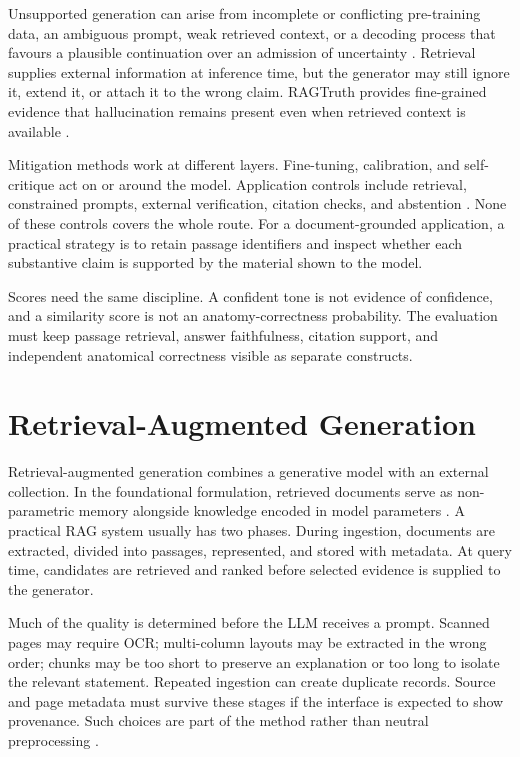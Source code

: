 Unsupported generation can arise from incomplete or conflicting pre-training data, an ambiguous prompt, weak retrieved context, or a decoding process that favours a plausible continuation over an admission of uncertainty \parencite{ji2023,wang2024factuality}. Retrieval supplies external information at inference time, but the generator may still ignore it, extend it, or attach it to the wrong claim. RAGTruth provides fine-grained evidence that hallucination remains present even when retrieved context is available \parencite{niu2024ragtruth}.

Mitigation methods work at different layers. Fine-tuning, calibration, and self-critique act on or around the model. Application controls include retrieval, constrained prompts, external verification, citation checks, and abstention \parencite{ji2023,wang2024factuality}. None of these controls covers the whole route. For a document-grounded application, a practical strategy is to retain passage identifiers and inspect whether each substantive claim is supported by the material shown to the model.

Scores need the same discipline. A confident tone is not evidence of confidence, and a similarity score is not an anatomy-correctness probability. The evaluation must keep passage retrieval, answer faithfulness, citation support, and independent anatomical correctness visible as separate constructs.

\section{Retrieval-Augmented Generation}
\label{sec:rag-background}

Retrieval-augmented generation combines a generative model with an external collection. In the foundational formulation, retrieved documents serve as non-parametric memory alongside knowledge encoded in model parameters \parencite{lewis2020}. A practical RAG system usually has two phases. During ingestion, documents are extracted, divided into passages, represented, and stored with metadata. At query time, candidates are retrieved and ranked before selected evidence is supplied to the generator.

Much of the quality is determined before the LLM receives a prompt. Scanned pages may require OCR; multi-column layouts may be extracted in the wrong order; chunks may be too short to preserve an explanation or too long to isolate the relevant statement. Repeated ingestion can create duplicate records. Source and page metadata must survive these stages if the interface is expected to show provenance. Such choices are part of the method rather than neutral preprocessing \parencite{xiong2024medrag}.

